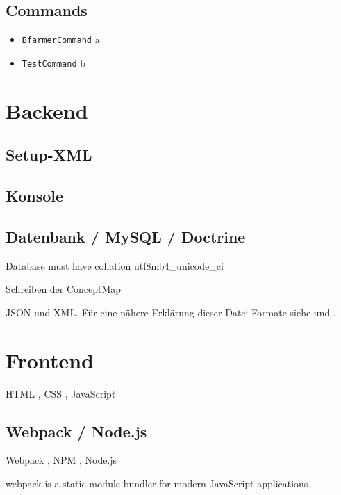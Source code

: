 \subsection{Commands}

\begin{itemize}
\item \texttt{BfarmerCommand} \newline a
\item \texttt{TestCommand} \newline b
\end{itemize}

\section{Backend}

\subsection{Setup-XML}

\subsection{Konsole}

\subsection{Datenbank / MySQL / Doctrine}

Database must have collation utf8mb4\_unicode\_ci

Schreiben der ConceptMap

JSON und XML. Für eine nähere Erklärung dieser Datei-Formate siehe \cite[JSON, Seite 133f]{bonnefoy2024definitive} und \cite[XML, Seite 134ff]{bonnefoy2024definitive}.

\section{Frontend}

HTML \cite{html}, CSS \cite{css}, JavaScript \cite{javascript}

\subsection{Webpack / Node.js}

Webpack \cite{webpack}, NPM \cite{npm}, Node.js \cite{nodejs}

webpack is a static module bundler for modern JavaScript applications


